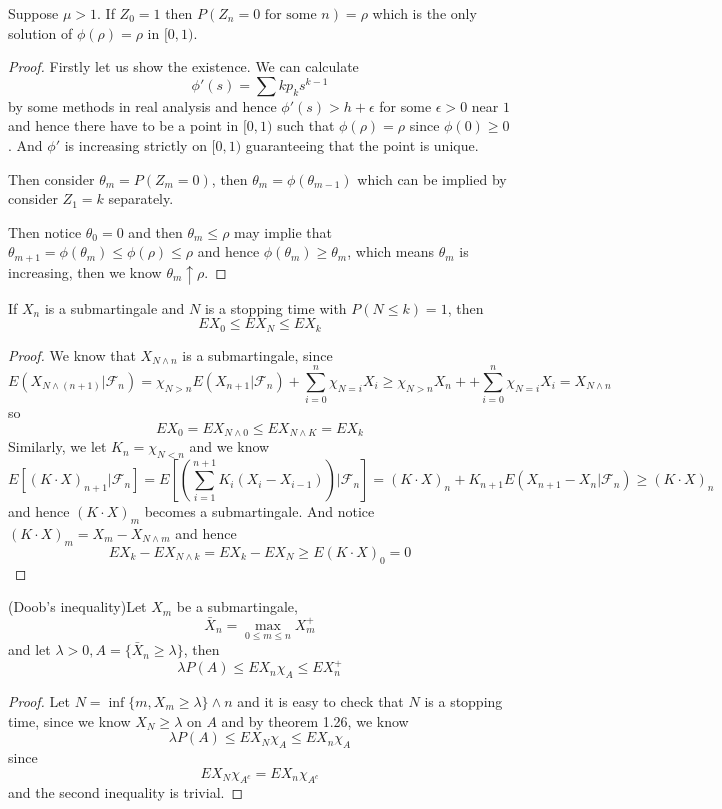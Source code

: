 \documentclass[lang=en, color=blue, ]{elegantbook}
\newcommand{\F}{\mathcal{F}}
\begin{document}
\begin{theorem}
    Suppose $\mu>1$. If $Z_0 = 1$ then $P(Z_n = 0\text{ for some }n) = \rho$ which is the only solution of $\phi(\rho) = \rho$ in $[0,1)$.    
\end{theorem}
\begin{proof}\par
    Firstly let us show the existence. We can calculate
    \[\phi'(s) = \sum kp_ks^{k-1}\]
    by some methods in real analysis and hence $\phi'(s) > h+\epsilon$ for some $\epsilon > 0$ near $1$ and hence there have to be a point in $[0,1)$ such that $\phi(\rho) = \rho$ since $\phi(0)\geq 0$. And $\phi'$ is increasing strictly on $[0,1)$ guaranteeing that the point is unique.\par
    Then consider $\theta_m = P(Z_m = 0)$, then $\theta_m = \phi(\theta_{m-1})$ which can be implied by consider $Z_1 = k$ separately.\par
    Then notice $\theta_0 = 0$ and then $\theta_m \leq \rho$ may implie that $\theta_{m+1} = \phi(\theta_m) \leq \phi(\rho) \leq \rho$ and hence $\phi(\theta_m) \geq \theta_m$, which means $\theta_m$ is increasing, then we know $\theta_m \uparrow \rho$.
\end{proof}

\begin{theorem}
    If $X_n$ is a submartingale and $N$ is a stopping time with $P(N\leq k )= 1$, then 
    \[
    EX_0 \leq EX_N \leq EX_k
    \]
\end{theorem}
\begin{proof}\par
    We know that $X_{N\wedge n}$ is a submartingale, since
    \[E(X_{N\wedge(n+1)}|\F_n) = \chi_{N>n}E(X_{n+1}|\F_n) + \sum\limits_{i=0}^n \chi_{N = i}X_i \geq \chi_{N>n}X_n + + \sum\limits_{i=0}^n \chi_{N = i}X_i= X_{N\wedge n}\]
    so
    \[EX_0 = EX_{N\wedge 0} \leq EX_{N\wedge K} = EX_k\]
    Similarly, we let $K_n = \chi_{N < n}$ and we know
    \[
        E[(K\cdot X)_{n+1}|\F_n] = E[(\sum\limits_{i=1}^{n+1}K_i(X_i-X_{i-1}))|\F_n] = (K\cdot X)_n + K_{n+1}E(X_{n+1}-X_n|\F_n) \geq (K\cdot X)_n
    \]
    and hence $(K\cdot X)_m$ becomes a submartingale. And notice $(K\cdot X)_m = X_m - X_{N\wedge m}$ and hence
    \[EX_k - EX_{N\wedge k} = EX_k - EX_N \geq E(K\cdot X)_0 = 0\]
\end{proof}

\begin{theorem}
    (Doob's inequality)Let $X_m$ be a submartingale, 
    \[\bar{X}_n = \max_{0\leq m \leq n}X_m^+\]
    and let $\lambda >0, A = \{\bar{X}_n \geq \lambda\}$, then
    \[\lambda P(A) \leq EX_n\chi_A \leq EX_n^+\]
\end{theorem}
\begin{proof}\par
    Let $N = \inf\{m, X_m \geq \lambda\}\wedge n$ and it is easy to check that $N$ is a stopping time, since we know $X_N \geq \lambda$ on $A$ and by theorem 1.26, we know
    \[\lambda P(A) \leq EX_N\chi_A \leq EX_n\chi_A\]
    since
    \[EX_N\chi_{A^c} = EX_n\chi_{A^c}\]
    and the second inequality is trivial.
\end{proof}
\end{document}
